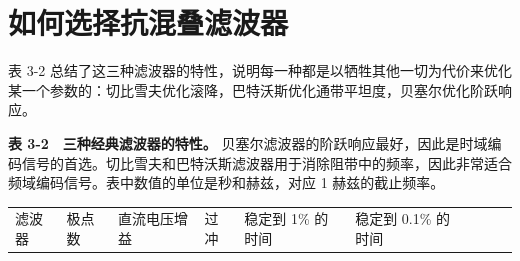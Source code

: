 \section{如何选择抗混叠滤波器}

表 3-2
总结了这三种滤波器的特性，说明每一种都是以牺牲其他一切为代价来优化某一个参数的：切比雪夫优化滚降，巴特沃斯优化通带平坦度，贝塞尔优化阶跃响应。

\textbf{表 3-2　三种经典滤波器的特性。}
贝塞尔滤波器的阶跃响应最好，因此是时域编码信号的首选。切比雪夫和巴特沃斯滤波器用于消除阻带中的频率，因此非常适合频域编码信号。表中数值的单位是秒和赫兹，对应
1 赫兹的截止频率。

\begingroup\scriptsize\setlength{\tabcolsep}{3pt}

{\def\LTcaptype{none} %
\begin{longtable}[]{@{}
  >{\raggedright\arraybackslash}p{}
  >{\raggedright\arraybackslash}p{}
  >{\raggedleft\arraybackslash}p{}
  >{\raggedleft\arraybackslash}p{}
  >{\raggedleft\arraybackslash}p{}
  >{\raggedleft\arraybackslash}p{}
  >{\raggedleft\arraybackslash}p{}
  >{\raggedleft\arraybackslash}p{}
  >{\raggedleft\arraybackslash}p{}@{}}
\toprule\noalign{}
\begin{minipage}[b]{\linewidth}\raggedright
滤波器
\end{minipage} & \begin{minipage}[b]{\linewidth}\raggedright
极点数
\end{minipage} & \begin{minipage}[b]{\linewidth}\raggedleft
直流电压增益
\end{minipage} & \begin{minipage}[b]{\linewidth}\raggedleft
过冲
\end{minipage} & \begin{minipage}[b]{\linewidth}\raggedleft
稳定到 1\% 的时间
\end{minipage} & \begin{minipage}[b]{\linewidth}\raggedleft
稳定到 0.1\% 的时间
\end{minipage} & \begin{minipage}[b]{\linewidth}\raggedleft

\end{minipage}
\end{longtable}}
